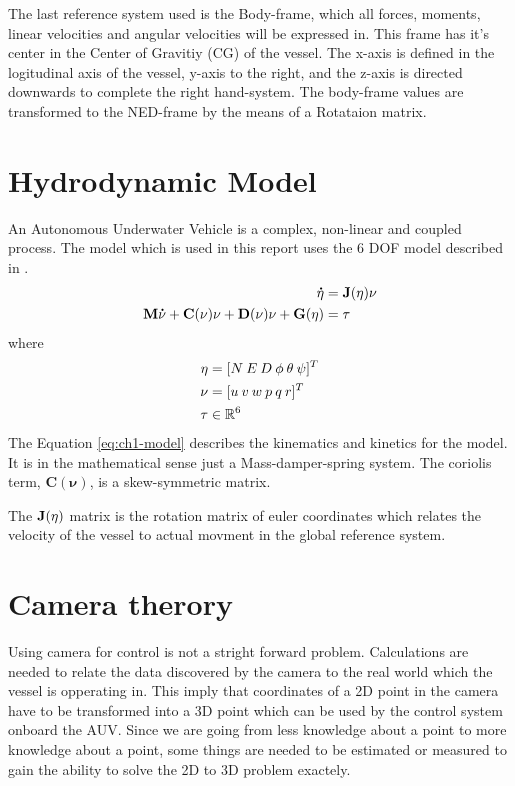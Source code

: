 	The last reference system used is the Body-frame, which all forces, moments, linear velocities and angular 
	velocities will be expressed in. This frame has it's center in the Center of Gravitiy (CG) of the vessel. The 
	x-axis is defined in the logitudinal axis of the vessel, y-axis to the right, and the z-axis is directed 
	downwards to complete the right hand-system. The body-frame values are transformed to the NED-frame by the means 
	of a Rotataion matrix.
	
	
	

\section{Hydrodynamic Model}
	\label{sec:ch1-model}
	An Autonomous Underwater Vehicle is a complex, non-linear and coupled process. The model which is used in this
	report uses the 6 DOF model described in \cite{fossen}.
	\begin{equation}
	\label{eq:ch1-model}
		\begin{aligned}
			\mathbf{\dot{\eta}} &= \mathbf{J}(\mathbf{\eta}) \mathbf{\nu} \\
			\mathbf{M}\mathbf{\dot{\nu}} + \mathbf{C}(\mathbf{\nu})\mathbf{\nu} + \mathbf{D}(\mathbf{\nu})\mathbf{\nu} + \mathbf{G}(\mathbf{\eta}) &= \mathbf{\tau} \\
		\end{aligned}
	\end{equation}
	where 
	\begin{align*}
		\mathbf{\eta} &= [N \: E \: D \: \phi \: \theta \: \psi ]^T \\
		\mathbf{\nu}  &= [u \: v \: w \: p \: q \: r]^T \\
		\mathbf{\tau} & \in \mathbb{R}^6
	\end{align*}
	The Equation \eqref{eq:ch1-model} describes the kinematics and kinetics for the model. It is in the 
	mathematical sense just a Mass-damper-spring system. The coriolis term, $\mathbf{C}(\mathbf{\nu})$, is 
	a skew-symmetric matrix.
	
	The $\mathbf{J}(\mathbf{\eta})$ matrix is the rotation matrix of euler coordinates which relates the velocity of the 
	vessel to actual movment in the global reference system.




\section{Camera therory}
	\label{ch1-cameramodel}
	Using camera for control is not a stright forward problem. Calculations are needed to relate the data discovered 
	by the camera to the real world which the vessel is opperating in. This imply that coordinates of a 2D point in 
	the camera have to be transformed into a 3D point which can be used by the control system onboard the AUV. Since 
	we are going from less knowledge about a point to more knowledge about a point, some things are needed to be 
	estimated or measured to gain the ability to solve the 2D to 3D problem exactely.
	
